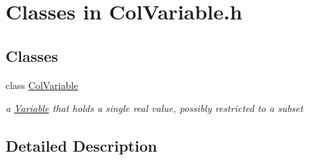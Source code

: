 \hypertarget{group___col_variable___c_l_a_s_s_e_s}{}\section{Classes in Col\+Variable.\+h}
\label{group___col_variable___c_l_a_s_s_e_s}
\subsection*{Classes}
\begin{DoxyCompactItemize}
\item 
class \mbox{\hyperlink{class_s_m_spp__di__unipi__it_1_1_col_variable}{Col\+Variable}}
\begin{DoxyCompactList}\small\item\em a \mbox{\hyperlink{class_s_m_spp__di__unipi__it_1_1_variable}{Variable}} that holds a single real value, possibly restricted to a subset \end{DoxyCompactList}\end{DoxyCompactItemize}


\subsection{Detailed Description}
